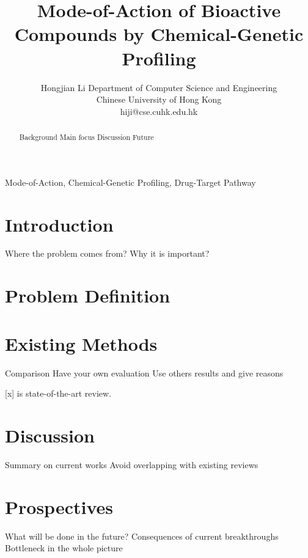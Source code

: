 \documentclass[12pt, conference, compsocconf]{../IEEEtran}
\begin{document}
\title{Mode-of-Action of Bioactive Compounds by Chemical-Genetic Profiling}
\author
{
\IEEEauthorblockN
{
Hongjian Li
\IEEEauthorblockA
{
Department of Computer Science and Engineering\\
Chinese University of Hong Kong\\
hiji@cse.cuhk.edu.hk
}
}
}
\maketitle

\begin{abstract}

Background
Main focus
Discussion
Future

\end{abstract}

\begin{IEEEkeywords}

Mode-of-Action, Chemical-Genetic Profiling, Drug-Target Pathway

\end{IEEEkeywords}

\section{Introduction}

Where the problem comes from?
Why it is important?

\section{Problem Definition}



\section{Existing Methods}

Comparison
Have your own evaluation
Use others results and give reasons

[x] is state-of-the-art review.

\section{Discussion}

Summary on current works
  Avoid overlapping with existing reviews

\section{Prospectives}

What will be done in the future?
  Consequences of current breakthroughs
  Bottleneck in the whole picture



\end{document}

